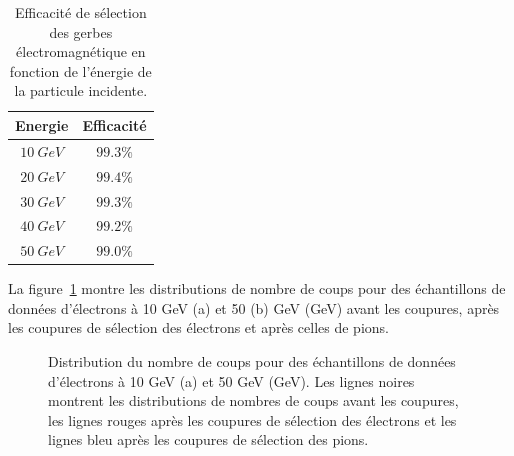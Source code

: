\begin{table}[!ht]
  \begin{center}
    \begin{tabular}{c|c}
      Energie & Efficacité \\
      \hline
      $10~GeV$ & $99.3\%$ \\
      $20~GeV$ & $99.4\%$ \\
      $30~GeV$ & $99.3\%$ \\
      $40~GeV$ & $99.2\%$ \\
      $50~GeV$ & $99.0\%$ \\
    \end{tabular}
  \end{center}  
  \caption{Efficacité de sélection des gerbes électromagnétique en fonction de l'énergie de la particule incidente.}
  \label{tab.e_sel_eff}
\end{table}
La figure~\ref{fig.e-Selection} montre les distributions de nombre de coups pour des échantillons de données d'électrons à 10 GeV (a) et 50 (b) GeV (GeV) avant les coupures, après les coupures de sélection des électrons et après celles de pions.
\begin{figure}[!ht]
  \caption{Distribution du nombre de coups pour des échantillons de données d'électrons à 10 GeV (a) et 50 GeV (GeV). Les lignes noires montrent les distributions de nombres de coups avant les coupures, les lignes rouges après les coupures de sélection des électrons et les lignes bleu après les coupures de sélection des pions. \label{fig.e-Selection}}
\end{figure}
